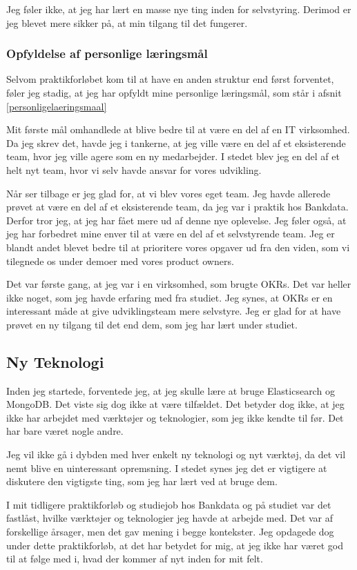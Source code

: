 \documentclass[a4paper]{article}
\begin{document}
Jeg føler ikke, at jeg har lært en masse nye ting inden for selvstyring.
Derimod er jeg blevet mere sikker på, at min tilgang til det fungerer.

\subsubsection{Opfyldelse af personlige læringsmål}
Selvom praktikforløbet kom til at have en anden struktur end først forventet,
føler jeg stadig, at jeg har opfyldt mine personlige læringsmål,
som står i afsnit \ref{personligelaeringsmaal}

Mit første mål omhandlede at blive bedre til at være en del af en IT virksomhed.
Da jeg skrev det, havde jeg i tankerne,
at jeg ville være en del af et eksisterende team,
hvor jeg ville agere som en ny medarbejder.
I stedet blev jeg en del af et helt nyt team,
hvor vi selv havde ansvar for vores udvikling.

Når ser tilbage er jeg glad for, at vi blev vores eget team.
Jeg havde allerede prøvet at være en del af et eksisterende team,
da jeg var i praktik hos Bankdata.
Derfor tror jeg, at jeg har fået mere ud af denne nye oplevelse.
Jeg føler også,
at jeg har forbedret mine enver til at være en del af et selvstyrende team.
Jeg er blandt andet blevet bedre til at prioritere vores opgaver ud fra den viden,
som vi tilegnede os under demoer med vores product owners.

Det var første gang, at jeg var i en virksomhed, som brugte OKRs.
Det var heller ikke noget, som jeg havde erfaring med fra studiet.
Jeg synes, at OKRs er en interessant måde at give udviklingsteam mere selvstyre.
Jeg er glad for at have prøvet en ny tilgang til det end dem,
som jeg har lært under studiet.

\subsection{Ny Teknologi}
Inden jeg startede, forventede jeg,
at jeg skulle lære at bruge Elasticsearch og MongoDB.
Det viste sig dog ikke at være tilfældet.
Det betyder dog ikke, at jeg ikke har arbejdet med værktøjer og teknologier,
som jeg ikke kendte til før.
Det har bare været nogle andre.

Jeg vil ikke gå i dybden med hver enkelt ny teknologi og nyt værktøj,
da det vil nemt blive en uinteressant opremsning.
I stedet synes jeg det er vigtigere at diskutere den vigtigste ting,
som jeg har lært ved at bruge dem.

I mit tidligere praktikforløb og studiejob hos Bankdata
og på studiet var det fastlåst,
hvilke værktøjer og teknologier jeg havde at arbejde med.
Det var af forskellige årsager, men det gav mening i begge kontekster.
Jeg opdagede dog under dette praktikforløb, at det har betydet for mig,
at jeg ikke har været god til at følge med i,
hvad der kommer af nyt inden for mit felt.
\end{document}
